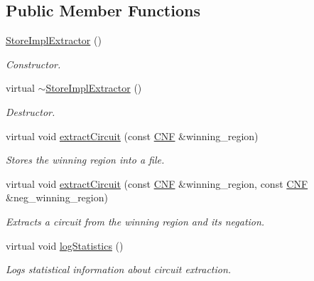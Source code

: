 \subsection*{Public Member Functions}
\begin{DoxyCompactItemize}
\item 
\hyperlink{classStoreImplExtractor_ab52feee236cb70953d9723c676601fb1}{Store\-Impl\-Extractor} ()
\begin{DoxyCompactList}\small\item\em Constructor. \end{DoxyCompactList}\item 
virtual \hyperlink{classStoreImplExtractor_ad617c7ffdeee1ddaec668b55deb4dc03}{$\sim$\-Store\-Impl\-Extractor} ()
\begin{DoxyCompactList}\small\item\em Destructor. \end{DoxyCompactList}\item 
virtual void \hyperlink{classStoreImplExtractor_a08437db801013d0b3208bbf099239fac}{extract\-Circuit} (const \hyperlink{classCNF}{C\-N\-F} \&winning\-\_\-region)
\begin{DoxyCompactList}\small\item\em Stores the winning region into a file. \end{DoxyCompactList}\item 
virtual void \hyperlink{classCNFImplExtractor_a5e9694425af3f1a76d8b21ace3c435d9}{extract\-Circuit} (const \hyperlink{classCNF}{C\-N\-F} \&winning\-\_\-region, const \hyperlink{classCNF}{C\-N\-F} \&neg\-\_\-winning\-\_\-region)
\begin{DoxyCompactList}\small\item\em Extracts a circuit from the winning region and its negation. \end{DoxyCompactList}\item 
virtual void \hyperlink{classCNFImplExtractor_aae098749e201b22294a70f6e0a4a58f0}{log\-Statistics} ()
\begin{DoxyCompactList}\small\item\em Logs statistical information about circuit extraction. \end{DoxyCompactList}\end{DoxyCompactItemize}
